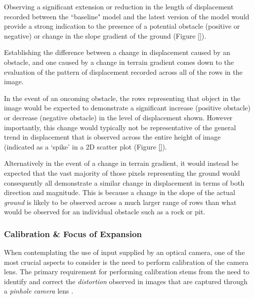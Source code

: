 Observing a significant extension or reduction in the length of displacement recorded between the ``baseline" model and the latest version of the model would provide a strong indication to the presence of a potential obstacle (positive or negative) or change in the slope gradient of the ground (Figure \ref{}).

  
 Establishing the difference between a change in displacement caused by an obstacle, and one caused by a change in terrain gradient comes down to the evaluation of the pattern of displacement recorded across all of the rows in the image.
 
In the event of an oncoming obstacle, the rows representing that object in the image would be expected to demonstrate a significant increase (positive obstacle) or decrease (negative obstacle) in the level of displacement shown. However importantly, this change would typically not be representative of the general trend in displacement that is observed across the entire height of image (indicated as a `spike' in a 2D scatter plot (Figure \ref{}). 

 
 Alternatively in the event of a change in terrain gradient, it would instead be expected that the vast majority of those pixels representing the ground would consequently all demonstrate a similar change in displacement in terms of both direction and magnitude. This is because a change in the slope of the actual \textit{ground} is likely to be observed across a much larger range of rows than what would be observed for an individual obstacle such as a rock or pit.
 
\subsubsection{Calibration \& Focus of Expansion}
\label{hypo-calib}

When contemplating the use of input supplied by an optical camera, one of the most crucial aspects to consider is the need to perform calibration of the camera lens. The primary requirement for performing calibration stems from the need to identify and correct the \textit{distortion} observed in images that are captured through a \textit{pinhole camera} lens \cite{camera-calib}. 


